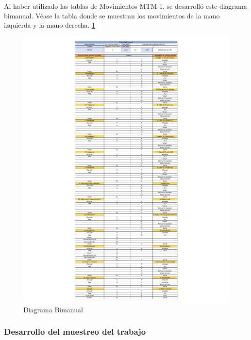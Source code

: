     Al haber utilizado las tablas de Movimientos MTM-1, se desarrolló este diagrama bimanual. Véase la tabla donde se muestran los movimientos de la mano izquierda y la mano derecha. \ref{fig:diagramaBimanual1} 
    \begin{figure}[H]
        \centering
        \includegraphics[scale=0.4]{3/Img/diagramaBimanual1.pdf}
        \caption{Diagrama Bimanual} 
        \label{fig:diagramaBimanual1}
    \end{figure}
    \subsubsection{Desarrollo del muestreo del trabajo}
    
